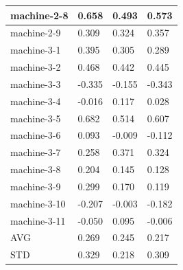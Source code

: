 \begin{table}[]
{\begin{tabular}{|l|l|l|l|}
			machine-2-8     & 0.658                        & 0.493                        & 0.573                         \\ \hline
			machine-2-9     & 0.309                        & 0.324                        & 0.357                         \\ \hline
			machine-3-1     & 0.395                        & 0.305                        & 0.289                         \\ \hline
			machine-3-2     & 0.468                        & 0.442                        & 0.445                         \\ \hline
			machine-3-3     & -0.335                       & -0.155                       & -0.343                        \\ \hline
			machine-3-4     & -0.016                       & 0.117                        & 0.028                         \\ \hline
			machine-3-5     & 0.682                        & 0.514                        & 0.607                         \\ \hline
			machine-3-6     & 0.093                        & -0.009                       & -0.112                        \\ \hline
			machine-3-7     & 0.258                        & 0.371                        & 0.324                         \\ \hline
			machine-3-8     & 0.204                        & 0.145                        & 0.128                         \\ \hline
			machine-3-9     & 0.299                        & 0.170                        & 0.119                         \\ \hline
			machine-3-10    & -0.207                       & -0.003                       & -0.182                        \\ \hline
			machine-3-11    & -0.050                       & 0.095                        & -0.006                        \\ \hline
			AVG             & 0.269                        & 0.245                        & 0.217                         \\ \hline
			STD             & 0.329                        & 0.218                        & 0.309                         \\ \hline
		\end{tabular}%
	}
\end{table}

